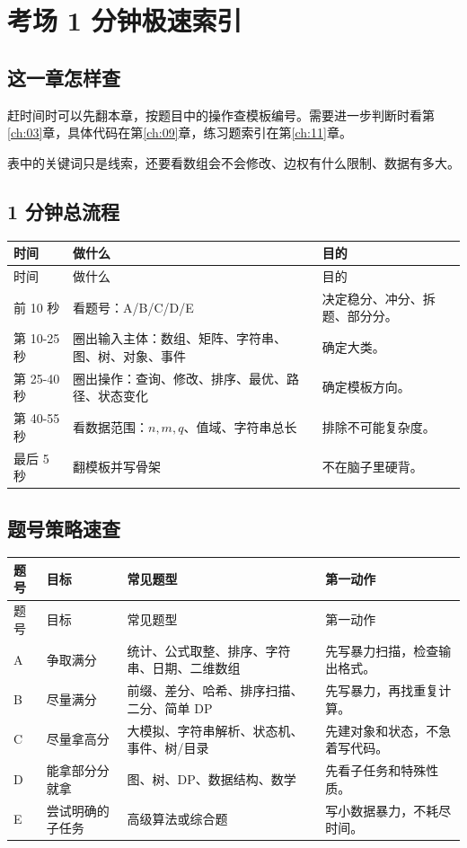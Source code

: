 \chapter{考场 1 分钟极速索引}\label{ch:02}

\section{这一章怎样查}\label{sec:02-1}

赶时间时可以先翻本章，按题目中的操作查模板编号。需要进一步判断时看第\ref{ch:03}章，具体代码在第\ref{ch:09}章，练习题索引在第\ref{ch:11}章。

表中的关键词只是线索，还要看数组会不会修改、边权有什么限制、数据有多大。

\section{1 分钟总流程}\label{sec:02-2}

\begin{longtable}{p{2.4cm}p{6.0cm}p{5.6cm}}
\toprule
时间 & 做什么 & 目的 \\
\midrule
\endfirsthead
\toprule
时间 & 做什么 & 目的 \\
\midrule
\endhead
前 10 秒 & 看题号：A/B/C/D/E & 决定稳分、冲分、拆题、部分分。 \\
第 10-25 秒 & 圈出输入主体：数组、矩阵、字符串、图、树、对象、事件 & 确定大类。 \\
第 25-40 秒 & 圈出操作：查询、修改、排序、最优、路径、状态变化 & 确定模板方向。 \\
第 40-55 秒 & 看数据范围：$n,m,q$、值域、字符串总长 & 排除不可能复杂度。 \\
最后 5 秒 & 翻模板并写骨架 & 不在脑子里硬背。 \\
\bottomrule
\end{longtable}

\section{题号策略速查}\label{sec:02-3}

\begin{longtable}{p{2cm}p{4.2cm}p{4.2cm}p{3.8cm}}
\toprule
题号 & 目标 & 常见题型 & 第一动作 \\
\midrule
\endfirsthead
\toprule
题号 & 目标 & 常见题型 & 第一动作 \\
\midrule
\endhead
A & 争取满分 & 统计、公式取整、排序、字符串、日期、二维数组 & 先写暴力扫描，检查输出格式。 \\
B & 尽量满分 & 前缀、差分、哈希、排序扫描、二分、简单 DP & 先写暴力，再找重复计算。 \\
C & 尽量拿高分 & 大模拟、字符串解析、状态机、事件、树/目录 & 先建对象和状态，不急着写代码。 \\
D & 能拿部分分就拿 & 图、树、DP、数据结构、数学 & 先看子任务和特殊性质。 \\
E & 尝试明确的子任务 & 高级算法或综合题 & 写小数据暴力，不耗尽时间。 \\
\bottomrule
\end{longtable}

